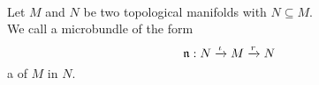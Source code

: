 \\ Let $M$ and $N$ be two topological manifolds with $N \subseteq M$.
\\ We call a microbundle of the form
\[\mathfrak{n}: N \xrightarrow{\iota} M \xrightarrow{r} N{}\]
a  of $M$ in $N$.